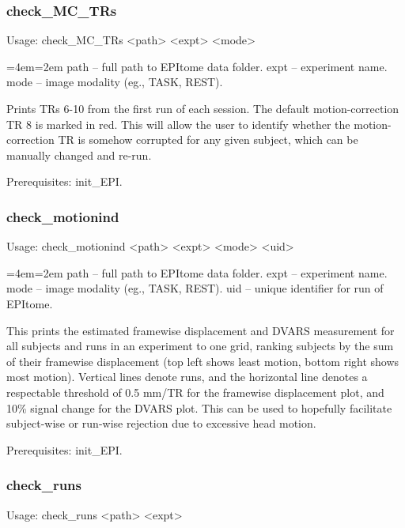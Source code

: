 \documentclass[final,titlepage,letterpaper,oneside,12pt]{article}
\renewcommand{\texttt}[2][BrickRed]{\textcolor{#1}{\ttfamily #2}}%
\newenvironment{blockquote}{%
  \par%
  \medskip
  \leftskip=4em\rightskip=2em%
  \noindent\ignorespaces}{%
  \par\medskip}
\begin{document}
\subsubsection{check\_MC\_TRs}
Usage: \texttt{check\_MC\_TRs <path> <expt> <mode>}

\begin{blockquote}
path -- full path to EPItome data folder.
expt -- experiment name.
mode -- image modality (eg., TASK, REST).
\end{blockquote}

\noindent Prints TRs 6-10 from the first run of each session. The default motion-correction TR 8 is marked in red. This will allow the user to identify whether the motion-correction TR is somehow corrupted for any given subject, which can be manually changed and re-run.

Prerequisites: \texttt{init\_EPI}.

\subsubsection{check\_motionind}
Usage: \texttt{check\_motionind <path> <expt> <mode> <uid>}

\begin{blockquote}
path -- full path to EPItome data folder.
expt -- experiment name.
mode -- image modality (eg., TASK, REST).
uid -- unique identifier for run of EPItome.
\end{blockquote}

\noindent This prints the estimated framewise displacement and DVARS measurement for all subjects and runs in an experiment to one grid, ranking subjects by the sum of their framewise displacement (top left shows least motion, bottom right shows most motion). Vertical lines denote runs, and the horizontal line denotes a respectable threshold of 0.5 mm/TR for the framewise displacement plot, and 10\% signal change for the DVARS plot. This can be used to hopefully facilitate subject-wise or run-wise rejection due to excessive head motion.

Prerequisites: \texttt{init\_EPI}.

\subsubsection{check\_runs}
Usage: \texttt{check\_runs <path> <expt>}
\end{document}
